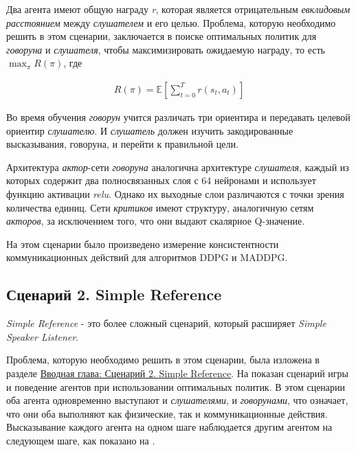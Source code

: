 Два агента имеют общую награду \textit{r}, которая является отрицательным \textit{евклидовым расстоянием} между \textit{слушателем} и его целью. Проблема, которую необходимо решить в этом сценарии, заключается в поиске оптимальных политик для \textit{говоруна} и \textit{слушателя}, чтобы максимизировать ожидаемую награду, то есть $\max_{\pi}R(\pi)$, где

\begin{equation}
    \begin{multlined}
        R(\pi) = \mathbb{E}[\sum_{t=0}^{T}r(s_t, a_t)]
    \end{multlined}
\end{equation}

Во время обучения \textit{говорун} учится различать три ориентира и передавать целевой ориентир \textit{слушателю}. И \textit{слушатель} должен изучить закодированные высказывания, говоруна, и перейти к правильной цели.

Архитектура \textit{актор}-сети \textit{говоруна} аналогична архитектуре \textit{слушателя}, каждый из которых содержит два полносвязанных слоя с 64 нейронами и использует функцию активации \textit{relu}. Однако их выходные слои различаются с точки зрения количества единиц. Сети \textit{критиков} имеют структуру, аналогичную сетям \textit{акторов}, за исключением того, что они выдают скалярное Q-значение.

На этом сценарии было произведено измерение консистентности коммуникационных действий для алгоритмов DDPG и MADDPG.

\subsection{Сценарий 2. Simple Reference} \label{exp-sr}

\textit{Simple Reference} - это более сложный сценарий, который расширяет \textit{Simple Speaker Listener}.

Проблема, которую необходимо решить в этом сценарии, была изложена в разделе \hyperref[intro-sr]{Вводная глава: Сценарий 2. Simple Reference}. На  показан сценарий игры и поведение агентов при использовании оптимальных политик. В этом сценарии оба агента одновременно выступают и \textit{слушателями}, и \textit{говорунами}, что означает, что они оба выполняют как физические, так и коммуникационные действия. Высказывание каждого агента на одном шаге наблюдается другим агентом на следующем шаге, как показано на . %

